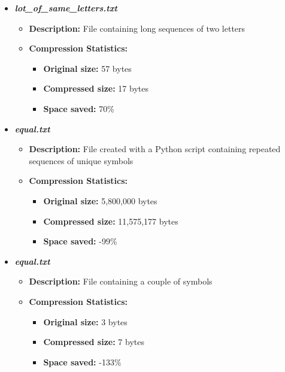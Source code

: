 \documentclass[12pt,oneside,letterpaper,english]{article}
\begin{document}
\begin{itemize}
\begin{itemize}
\begin{itemize}
                \end{itemize}
        \end{itemize}
    \item \textbf{\textit{lot\_of\_same\_letters.txt}}
        \begin{itemize}
            \item \textbf{Description:} File containing long sequences of two letters
            \item \textbf{Compression Statistics:} 
                \begin{itemize}
                    \item \textbf{Original size:} 57 bytes
                    \item \textbf{Compressed size:} 17 bytes
                    \item \textbf{Space saved:} 70\%
                \end{itemize}
        \end{itemize}
    \item \textbf{\textit{equal.txt}}
        \begin{itemize}
            \item \textbf{Description:} File created with a Python script containing repeated sequences of unique symbols
            \item \textbf{Compression Statistics:} 
                \begin{itemize}
                    \item \textbf{Original size:} 5,800,000 bytes
                    \item \textbf{Compressed size:} 11,575,177 bytes
                    \item \textbf{Space saved:} -99\%
                \end{itemize}
        \end{itemize}
    \item \textbf{\textit{equal.txt}}
        \begin{itemize}
            \item \textbf{Description:} File containing a couple of symbols
            \item \textbf{Compression Statistics:} 
                \begin{itemize}
                    \item \textbf{Original size:} 3 bytes
                    \item \textbf{Compressed size:} 7 bytes
                    \item \textbf{Space saved:} -133\%
                \end{itemize}
        \end{itemize}
\end{itemize}
\end{document}
